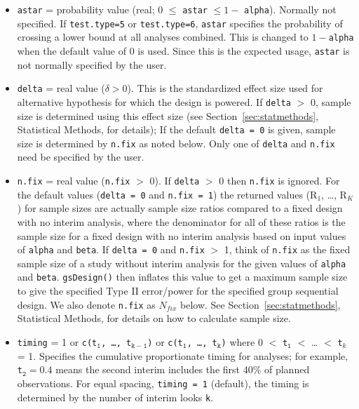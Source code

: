 \begin{itemize}
\item \texttt{astar} = probability value (real; 0 $\leq$ \texttt{astar} 
$\leq 1 -$ \texttt{alpha}). Normally not specified. If \texttt{test.type=5} or 
\texttt{test.type=6},
\texttt{astar} specifies the probability of crossing a lower bound at all
analyses combined. This is changed to $1 - $\texttt{alpha} when the default 
value of 0 is used. Since this is the expected usage, \texttt{astar} is 
not normally specified by the user.

\item \texttt{delta} = real value ($\delta > 0$). This is the standardized
effect size used for alternative hypothesis for which the design is powered.
If \texttt{delta}
$>$
0, sample size is determined using this effect size (see 
Section~\ref{sec:statmethods}, Statistical Methods, for details); If the 
default \texttt{delta = 0} is given, sample size is
determined by \texttt{n.fix} as noted below. Only one of \texttt{delta} and
\texttt{n.fix} need be specified by the user.

\item \texttt{n.fix} = real value (\texttt{n.fix}
$>$
0). If \texttt{delta}%
$>$%
0 then \texttt{n.fix} is ignored. For the default values (\texttt{delta = 0} and
\texttt{n.fix = 1}) the returned values (R$_{1}$, \ldots, R$_{K}$) for sample
sizes are actually sample size ratios compared to a fixed design with no
interim analysis, where the denominator for all of these ratios is the sample
size for a fixed design with no interim analysis based on input values of
\texttt{alpha} and \texttt{beta}. If \texttt{delta = 0} and \texttt{n.fix}
$>$
1, think of \texttt{n.fix} as the fixed sample size of a study without interim
analysis for the given values of \texttt{alpha} and \texttt{beta}.
\texttt{gsDesign()} then inflates this value to get a maximum sample size
to give the specified Type II error/power for the specified group sequential
design. We also denote \texttt{n.fix} as $N_{fix}$ below. See 
Section~\ref{sec:statmethods}, Statistical Methods,
for details on how to calculate sample size.

\item \texttt{timing} = 1 or \texttt{c(t}$_{\mathtt{1}}$\texttt{, \ldots,
t}$_{\mathtt{k-1}}$\texttt{)} or \texttt{c(t}$_{\mathtt{1}}$\texttt{, \ldots, 
t}$_{\mathtt{k}}$\texttt{)} where 0 %
$<$%
 \texttt{t}$_{\mathtt{1}}$ 
$<$%
 \ldots %
$<$%
 \texttt{t}$_{k}$ = 1. Specifies the cumulative proportionate timing for
analyses; for example, \texttt{t}$_{\mathtt{2}} = 0.4$ means the second interim 
includes the first 40\% of planned observations. For equal spacing,
\texttt{timing = 1} (default), the timing is determined by the number of
interim looks \texttt{k}.


\end{itemize}

